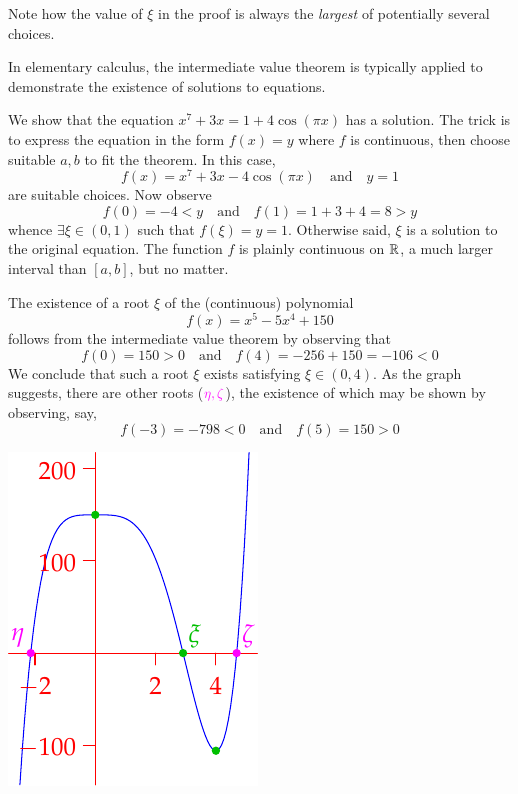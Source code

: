 Note how the value of $\xi$ in the proof is always the \emph{largest} of potentially several choices.%


\begin{examples}{}{}
	In elementary calculus, the intermediate value theorem is typically applied to demonstrate the existence of solutions to equations.
	\begin{enumerate}
	  \item We show that the equation $x^7+3x=1+4\cos(\pi x)$ has a solution.\smallbreak
		The trick is to express the equation in the form $f(x)=y$ where $f$ is continuous, then choose suitable $a,b$ to fit the theorem. In this case,
		\[
			f(x)=x^7+3x-4\cos(\pi x)
			\quad\text{and}\quad 
			y=1
		\]
		are suitable choices. Now observe
		\[
			f(0)=-4<y
			\quad\text{and}\quad 
			f(1)=1+3+4=8>y 
			\tag{i.e., $a=0$ and $b=1$}
		\]
		whence $\exists\xi\in(0,1)$ such that $f(\xi)=y=1$. Otherwise said, $\xi$ is a solution to the original equation.\smallbreak
		The function $f$ is plainly continuous on $\mathbb{R}$, a much larger interval than $[a,b]$, but no matter.
		
		\goodbreak
		
		\begin{minipage}[t]{0.7\linewidth}\vspace{0pt}
			\item\label{ex:oddpolyroot2} The existence of a root $\xi$ of the (continuous) polynomial
			\[
				f(x)=x^5-5x^4+150
			\]
			follows from the intermediate value theorem by observing that
			\[
				f(0)=150>0
				\quad\text{and}\quad 
				f(4)=-256+150=-106<0
			\]
			We conclude that such a root $\xi$ exists satisfying $\xi\in(0,4)$.\smallbreak
			As the graph suggests, there are other roots ($\textcolor{Magenta}{\eta,\zeta}$), the existence of which may be shown by observing, say,
			\[
				f(-3)=-798<0 
				\quad\text{and}\quad 
				f(5)=150>0
			\]
		\end{minipage}
		\hfill
		\begin{minipage}[t]{0.29\linewidth}\vspace{0pt}
			\flushright\includegraphics[scale=0.95]{intval2}
		\end{minipage}
		\medbreak


\end{enumerate}
\end{examples}
